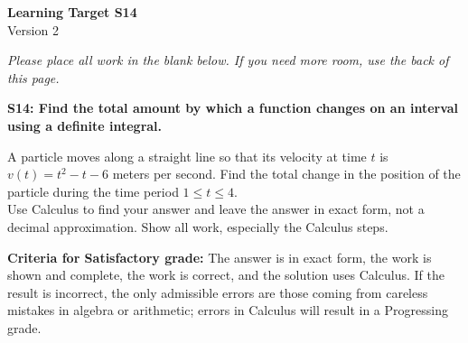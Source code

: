 \documentclass[10pt]{article}
\begin{document}
	\vspace*{0in}

		\begin{center}
			\textbf{Learning Target S14} \\
			{Version 2} \\
		\end{center}

\emph{Please place all work in the blank below. If you need more room, use the back of this page.}

\begin{framed}
	\textbf{S14: Find the total amount by which a function changes on an interval using a definite integral.}
\end{framed}

A particle moves along a straight line so that its velocity at time $t$ is $v(t) = t^2 - t -6$ meters per second. Find the total change in the position of the particle during the time period $1 \leq t \leq 4$.\\

Use Calculus to find your answer and leave the answer in exact form, not a decimal approximation. Show all work, especially the Calculus steps. 



\vfill


\begin{small}
    \begin{framed}
        	\textbf{Criteria for Satisfactory grade:} The answer is in exact form, the work is shown and complete, the work is correct, and the solution uses Calculus. If the result is incorrect, the only admissible errors are those coming from careless mistakes in algebra or arithmetic; errors in Calculus will result in a Progressing grade. 
    \end{framed}

\end{small}
\end{document}
